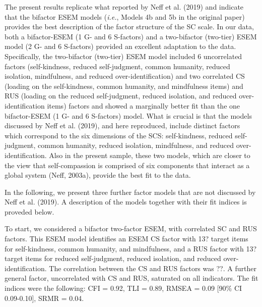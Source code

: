 \documentclass[
  english,
  man,floatsintext]{apa7}
\begin{document}
The present results replicate what reported by Neff et al. (2019) and indicate that the bifactor ESEM models (\emph{i.e.}, Models 4b and 5b in the original paper) provides the best description of the factor structure of the SC scale. In our data, both a bifactor-ESEM (1 G- and 6 S-factors) and a two-bifactor (two-tier) ESEM model (2 G- and 6 S-factors) provided an excellent adaptation to the data. Specifically, the two-bifactor (two-tier) ESEM model included 6 uncorrelated factors (self-kindness, reduced self-judgment, common humanity, reduced isolation, mindfulness, and reduced over-identification) and two correlated CS (loading on the self-kindness, common humanity, and mindfulness items) and RUS (loading on the reduced self-judgment, reduced isolation, and reduced over-identification items) factors and showed a marginally better fit than the one bifactor-ESEM (1 G- and 6 S-factors) model. What is crucial is that the models discussed by Neff et al. (2019), and here reproduced, include distinct factors which correspond to the six dimensions of the SCS: self-kindness, reduced self-judgment, common humanity, reduced isolation, mindfulness, and reduced over-identification. Also in the present sample, these two models, which are closer to the view that self-compassion is comprised of six components that interact as a global system (Neff, 2003a), provide the best fit to the data.

In the following, we present three further factor models that are not discussed by Neff et al. (2019). A description of the models together with their fit indices is proveded below.

To start, we considered a bifactor two-factor ESEM, with correlated SC and RUS factors. This ESEM model identifies an ESEM CS factor with 13? target items for self-kindness, common humanity, and mindfulness, and a RUS factor with 13? target items for reduced self-judgment, reduced isolation, and reduced over-identification. The correlation between the CS and RUS factors was ??. A further general factor, uncorrelated with CS and RUS, saturated on all indicators. The fit indices were the following: CFI = 0.92, TLI = 0.89, RMSEA = 0.09 {[}90\% CI 0.09-0.10{]}, SRMR = 0.04.
\end{document}
